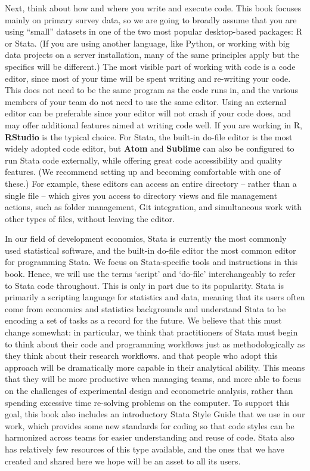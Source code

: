 Next, think about how and where you write and execute code.
This book focuses mainly on primary survey data,
so we are going to broadly assume that you are using ``small'' datasets
in one of the two most popular desktop-based packages: R or Stata.
(If you are using another language, like Python,
or working with big data projects on a server installation,
many of the same principles apply but the specifics will be different.)
The most visible part of working with code is a code editor,
since most of your time will be spent writing and re-writing your code.
This does not need to be the same program as the code runs in,
and the various members of your team do not need to use the same editor.
Using an external editor can be preferable since your editor will not crash if your code does,
and may offer additional features aimed at writing code well.
If you are working in R, \textbf{RStudio} is the typical choice.
For Stata, the built-in do-file editor is the most widely adopted code editor,
but \textbf{Atom} and
\textbf{Sublime}
can also be configured to run Stata code externally,
while offering great code accessibility and quality features.
(We recommend setting up and becoming comfortable with one of these.)
For example, these editors can access an entire directory -- rather than a single file --
which gives you access to directory views and file management actions,
such as folder management, Git integration,
and simultaneous work with other types of files, without leaving the editor.

In our field of development economics,
Stata is currently the most commonly used statistical software,
and the built-in do-file editor the most common editor for programming Stata.
We focus on Stata-specific tools and instructions in this book.
Hence, we will use the terms `script' and `do-file'
interchangeably to refer to Stata code throughout.
This is only in part due to its popularity.
Stata is primarily a scripting language for statistics and data,
meaning that its users often come from economics and statistics backgrounds
and understand Stata to be encoding a set of tasks as a record for the future.
We believe that this must change somewhat:
in particular, we think that practitioners of Stata
must begin to think about their code and programming workflows
just as methodologically as they think about their research workflows.
and that people who adopt this approach will be dramatically
more capable in their analytical ability.
This means that they will be more productive when managing teams,
and more able to focus on the challenges of experimental design
and econometric analysis, rather than spending excessive time
re-solving problems on the computer.
To support this goal, this book also includes
an introductory Stata Style Guide
that we use in our work, which provides
some new standards for coding so that code styles
can be harmonized across teams for easier understanding and reuse of code.
Stata also has relatively few resources of this type available,
and the ones that we have created and shared here
we hope will be an asset to all its users.

